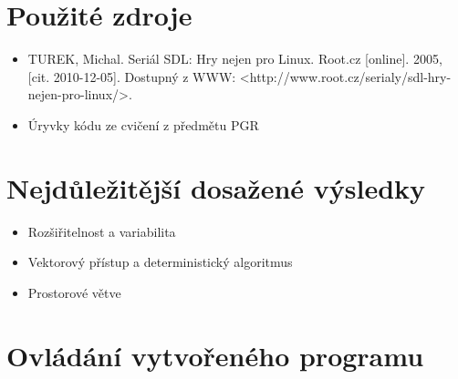 \documentclass[11pt,a4paper]{article}
\begin{document}
\section{Použité zdroje}

%

\begin{itemize}
\item TUREK, Michal. Seriál SDL: Hry nejen pro Linux. Root.cz [online]. 2005, [cit. 2010-12-05]. Dostupný z WWW: {\textless}http://www.root.cz/serialy/sdl-hry-nejen-pro-linux/{\textgreater}.
\item Úryvky kódu ze cvičení z předmětu PGR
\end{itemize}

\section{Nejdůležitější dosažené výsledky}


\begin{itemize}
\item Rozšiřitelnost a variabilita
\item Vektorový přístup a deterministický algoritmus
\item Prostorové větve
\end{itemize}

\section{Ovládání vytvořeného programu}

%
\end{document}
